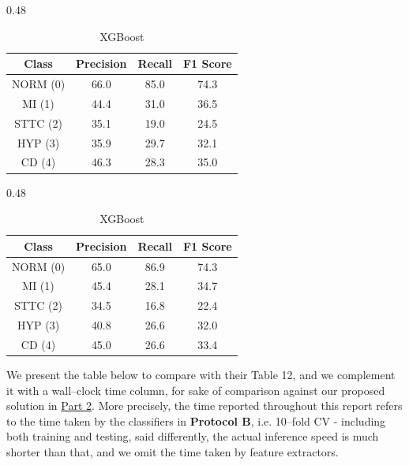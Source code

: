 \begin{table}[H]
    \begin{subtable}[t]{0.48\textwidth}
        \centering
        \caption{CatBoost}
        \label{tab:cv_cat}
        \begin{tabular}{cccc}
            \toprule
            Class & Precision & Recall & F1 Score \\
            \midrule
            NORM (0) & 66.0 & 85.0 & 74.3 \\
            MI   (1) & 44.4 & 31.0 & 36.5 \\
            STTC (2) & 35.1 & 19.0 & 24.5 \\
            HYP  (3) & 35.9 & 29.7 & 32.1 \\
            CD   (4) & 46.3 & 28.3 & 35.0 \\
            \bottomrule
        \end{tabular}
    \end{subtable}
    \hfill
    \begin{subtable}[t]{0.48\textwidth}
        \centering
        \caption{XGBoost}
        \label{tab:cv_xgb}
        \begin{tabular}{cccc}
            \toprule
            Class & Precision & Recall & F1 Score \\
            \midrule
            NORM (0) & 65.0 & 86.9 & 74.3 \\
            MI   (1) & 45.4 & 28.1 & 34.7 \\
            STTC (2) & 34.5 & 16.8 & 22.4 \\
            HYP  (3) & 40.8 & 26.6 & 32.0 \\
            CD   (4) & 45.0 & 26.6 & 33.4 \\
            \bottomrule
        \end{tabular}
    \end{subtable}
\end{table}

We present the table below to compare with their Table 12, and we complement it with a wall–clock time column, for sake of comparison against our proposed solution in \href{sec:part_2}{Part 2}.
More precisely, the time reported throughout this report refers to the time taken by the classifiers in \textbf{Protocol B}, i.e. 10–fold CV - including both training and testing, said differently, the actual inference speed is much shorter than that, and we omit the time taken by feature extractors.

